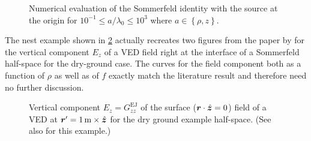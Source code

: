\begin{figure}
    \caption[Numerical evaluation of the Sommerfeld identity]
    {Numerical evaluation of the Sommerfeld identity with the source at
    the origin for $10^{-1} \leq a / \lambda_0 \leq 10^{3}$ where
    $a \in \left\{ \rho, z \right\}$.}
    \label{fig:somm_id_ref_time}
\end{figure}




The nest example shown in \cref{fig:surface_E_z_of_rho_and_f_axial_transmission}
actually recreates two figures from the paper by \textcite{Michalski2016b}
for the vertical component $E_z$ of a \ac{VED} field right at the interface
of a Sommerfeld half-space for the dry-ground case.
The curves for the field component both as a function of $\rho$ as well as of
$f$ exactly match the literature result and therefore need no further
discussion.

\begin{figure}
    \newcommand{\widthFactor}{0.47}
    \newcommand{\heightFactor}{0.35}
    \centering
        \caption[]{Vertical component $E_z = G^\mathrm{EJ}_{zz}$ of the surface
        ($\robs \cdot \uv{z} = 0$) field of a \ac{VED} at
        $\rsrc = \SI{1}{\metre} \times \uv{z}$ for the dry ground example
        half-space.
        (See also \textcite{Michalski2016b} for this example.)}
        \label{fig:surface_E_z_of_rho_and_f_axial_transmission}
\end{figure}

